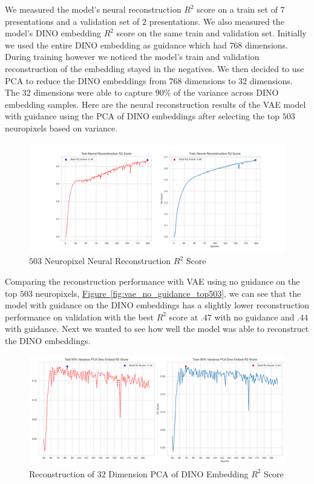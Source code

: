 \documentclass[12pt, letterpaper]{article}
\begin{document}
We measured the model's neural reconstruction $R^2$ score on a train set of $7$ presentations and a validation set of $2$ presentations. We also measured the model's DINO \cite{dino} embedding $R^2$ score on the same train and validation set. Initially we used the entire DINO \cite{dino} embedding as guidance which had $768$ dimensions. During training however we noticed the model's train and validation reconstruction of the embedding stayed in the negatives. We then decided to use PCA to reduce the DINO \cite{dino} embeddings from $768$ dimensions to $32$ dimensions. The $32$ dimensions were able to capture $90\%$ of the variance across DINO \cite{dino} embedding samples. Here are the neural reconstruction results of the VAE model with guidance using the PCA of DINO \cite{dino} embeddings after selecting the top $503$ neuropixels based on variance.

\begin{figure}[H]
    \centering
    \includegraphics[width=1.0\textwidth]{x_r2_128dim_503_top_var_200_epochs_0.05_beta_2_layer_.9_pca_DINO_embed.png}
    \caption{$503$ Neuropixel Neural Reconstruction $R^2$ Score}
    \label{fig:vae_guidance_DINO_pca}
\end{figure}

Comparing the reconstruction performance with VAE using no guidance on the top $503$ neuropixels, \hyperref[fig:vae_no_guidance_top503]{Figure~\ref{fig:vae_no_guidance_top503}}, we can see that the model with guidance on the DINO \cite{dino} embeddings has a slightly lower reconstruction performance on validation with the best $R^2$ score at $.47$ with no guidance and $.44$ with guidance. Next we wanted to see how well the model was able to reconstruct the DINO \cite{dino} embeddings.

\begin{figure}[H]
    \centering
    \includegraphics[width=.9\textwidth]{.9_pca_DINO_embed_r2_128dim_503_top_var_200_epochs_0.05_beta_2_layer.png}
    \caption{Reconstruction of $32$ Dimension PCA of DINO Embedding $R^2$ Score}
    \label{fig:vae_guidance_DINO_pca_DINO_embed_r2}
\end{figure}
\end{document}
